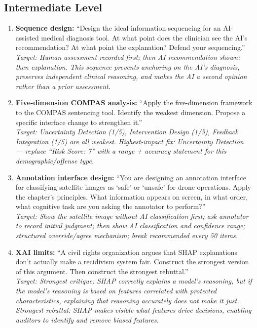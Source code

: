 \subsection{Intermediate Level}

\begin{enumerate}
    \item \textbf{Sequence design:} ``Design the ideal information sequencing for an AI-assisted medical diagnosis tool. At what point does the clinician see the AI's recommendation? At what point the explanation? Defend your sequencing.''\\
    \textit{Target: Human assessment recorded first; then AI recommendation shown; then explanation. This sequence prevents anchoring on the AI's diagnosis, preserves independent clinical reasoning, and makes the AI a second opinion rather than a prior assessment.}

    \item \textbf{Five-dimension COMPAS analysis:} ``Apply the five-dimension framework to the COMPAS sentencing tool. Identify the weakest dimension. Propose a specific interface change to strengthen it.''\\
    \textit{Target: Uncertainty Detection (1/5), Intervention Design (1/5), Feedback Integration (1/5) are all weakest. Highest-impact fix: Uncertainty Detection --- replace ``Risk Score: 7'' with a range + accuracy statement for this demographic/offense type.}

    \item \textbf{Annotation interface design:} ``You are designing an annotation interface for classifying satellite images as `safe' or `unsafe' for drone operations. Apply the chapter's principles. What information appears on screen, in what order, what cognitive task are you asking the annotator to perform?''\\
    \textit{Target: Show the satellite image without AI classification first; ask annotator to record initial judgment; then show AI classification and confidence range; structured override/agree mechanism; break recommended every 50 items.}

    \item \textbf{XAI limits:} ``A civil rights organization argues that SHAP explanations don't actually make a recidivism system fair. Construct the strongest version of this argument. Then construct the strongest rebuttal.''\\
    \textit{Target: Strongest critique: SHAP correctly explains a model's reasoning, but if the model's reasoning is based on features correlated with protected characteristics, explaining that reasoning accurately does not make it just. Strongest rebuttal: SHAP makes visible what features drive decisions, enabling auditors to identify and remove biased features.}
\end{enumerate}

